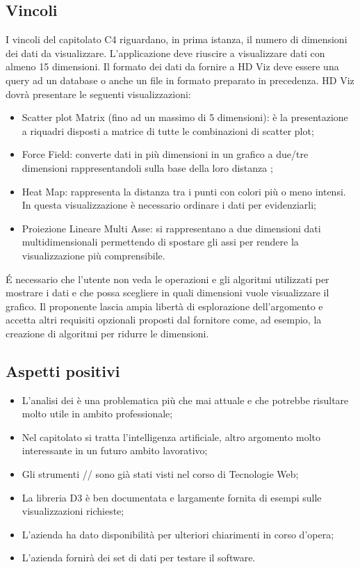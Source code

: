 \subsection{Vincoli}
I vincoli del capitolato C4 riguardano, in prima istanza, il numero di dimensioni dei dati da visualizzare. L'applicazione deve riuscire a visualizzare dati con almeno 15 dimensioni. 
Il formato dei dati da fornire a HD Viz deve essere una query ad un database o anche un file in formato  preparato in precedenza.
HD Viz dovrà presentare le seguenti visualizzazioni: 
\begin{itemize}
\item Scatter plot Matrix (fino ad un massimo di 5 dimensioni): è la presentazione a riquadri disposti a matrice di tutte le combinazioni di scatter plot; 
\item Force Field: converte dati in più dimensioni in un grafico a due/tre dimensioni rappresentandoli sulla base della loro distanza ; 
\item Heat Map: rappresenta la distanza tra i punti con colori più o meno intensi. In questa visualizzazione è necessario ordinare i dati per evidenziarli; 
\item Proiezione Lineare Multi Asse: si rappresentano a due dimensioni dati multidimensionali permettendo di spostare gli assi per rendere la visualizzazione più comprensibile.  
\end{itemize} 
\'E necessario che l'utente non veda le operazioni e gli algoritmi utilizzati per mostrare i dati e che possa scegliere in quali dimensioni vuole visualizzare il grafico.
Il proponente lascia ampia libertà di esplorazione dell'argomento e accetta altri requisiti opzionali proposti dal fornitore come, ad esempio, la creazione di algoritmi per ridurre le dimensioni.

\subsection{Aspetti positivi}
\begin{itemize}
\item L'analisi dei  è una problematica più che mai attuale e che potrebbe risultare molto utile in ambito professionale;
\item Nel capitolato si tratta l'intelligenza artificiale, altro argomento molto interessante in un futuro ambito lavorativo;
\item Gli strumenti // sono già stati visti nel corso di Tecnologie Web;
\item La libreria D3 è ben documentata e largamente fornita di esempi sulle visualizzazioni richieste;
\item L'azienda ha dato disponibilità per ulteriori chiarimenti in corso d'opera;
\item L'azienda fornirà dei set di dati per testare il software.
\end{itemize}

